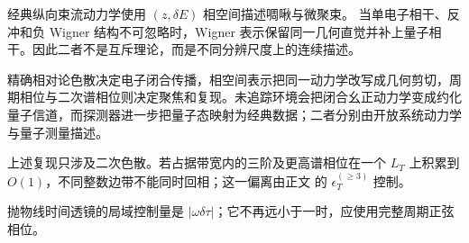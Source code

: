 经典纵向束流动力学使用 $(z,\delta E)$ 相空间描述啁啾与微聚束。\cite{Pellegrini2016FEL} 当单电子相干、反冲和负 Wigner 结构不可忽略时，Wigner 表示保留同一几何直觉并补上量子相干。因此二者不是互斥理论，而是不同分辨尺度上的连续描述。

精确相对论色散决定电子闭合传播，相空间表示把同一动力学改写成几何剪切，周期相位与二次谱相位则决定聚焦和复现。未追踪环境会把闭合幺正动力学变成约化量子信道，而探测器进一步把量子态映射为经典数据；二者分别由开放系统动力学与量子测量描述。

上述复现只涉及二次色散。若占据带宽内的三阶及更高谱相位在一个 $L_T$ 上积累到 $O(1)$，不同整数边带不能同时回相；这一偏离由正文 的 $\epsilon_T^{(\ge3)}$ 控制。

抛物线时间透镜的局域控制量是 $|\omega\delta\tau|$；它不再远小于一时，应使用完整周期正弦相位。





